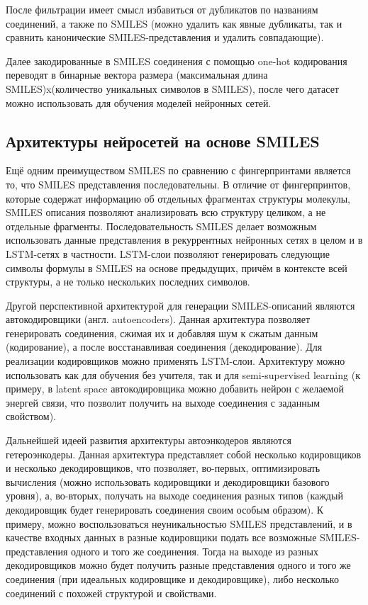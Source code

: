 \documentclass[a4paper,14pt]{extreport}
\begin{document}
    После фильтрации имеет смысл избавиться от дубликатов по названиям соединений, а также по SMILES (можно удалить как явные дубликаты, так и сравнить канонические SMILES-представления и удалить совпадающие).
    
   Далее закодированные в SMILES соединения с помощью one-hot кодирования переводят в бинарные вектора размера (максимальная длина SMILES)x(количество уникальных символов в SMILES), после чего датасет можно использовать для обучения моделей нейронных сетей.
  
  \subsection{Архитектуры нейросетей на основе SMILES}
  \label{ss:fp_other_subsec}
  Ещё одним преимуществом SMILES по сравнению с фингерпринтами является то, что SMILES представления последовательны. В отличие от фингерпринтов, которые содержат информацию об отдельных фрагментах структуры молекулы, SMILES описания позволяют анализировать всю структуру целиком, а не отдельные фрагменты. Последовательность SMILES делает возможным использовать данные представления в рекуррентных нейронных сетях в целом и в LSTM-сетях в частности. LSTM-слои позволяют генерировать следующие символы формулы в SMILES на основе предыдущих, причём в контексте всей структуры, а не только нескольких последних символов. 
  
  Другой перспективной архитектурой для генерации SMILES-описаний являются автокодировщики (англ. autoencoders). Данная архитектура позволяет генерировать соединения, сжимая их и добавляя шум к сжатым данным (кодирование), а после восстанавливая соединения (декодирование). Для реализации кодировщиков можно применять LSTM-слои. Архитектуру можно использовать как для обучения без учителя, так и для semi-supervised learning (к примеру, в latent space автокодировщика можно добавить нейрон с желаемой энергей связи, что позволит получить на выходе соединения с заданным свойством).
  
  Дальнейшей идеей развития архитектуры автоэнкодеров являются гетероэнкодеры. Данная архитектура представляет собой несколько кодировщиков и несколько декодировщиков, что позволяет, во-первых, оптимизировать вычисления (можно использовать кодировщики и декодировщики базового уровня), а, во-вторых, получать на выходе соединения разных типов (каждый декодировщик будет генерировать соединения своим особым образом). К примеру, можно воспользоваться неуникальностью SMILES представлений, и в качестве входных данных в разные кодировщики подать все возможные SMILES-представления одного и того же соединения. Тогда на выходе из разных декодировщиков можно будет получить разные представления одного и того же соединения (при идеальных кодировщике и декодировщике), либо несколько соединений с похожей структурой и свойствами.
  
\end{document}
